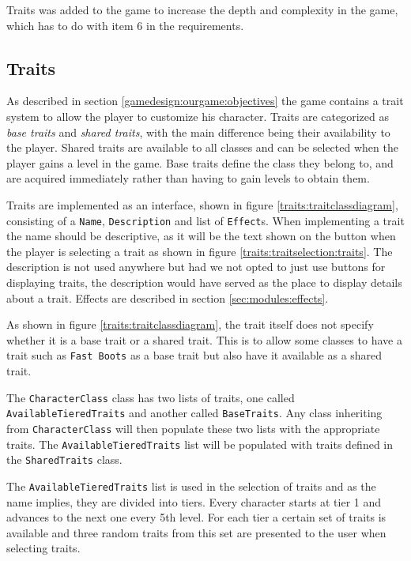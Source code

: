 Traits was added to the game to increase the depth and complexity in the game, which has to do with item 6 in the requirements.
\subsection{Traits}
\label{sec:modules:traits}
As described in section \ref{gamedesign:ourgame:objectives} the game contains a trait system to allow the player to customize his character.
Traits are categorized as \textit{base traits} and \textit{shared traits}, with the main difference being their availability to the player.
Shared traits are available to all classes and can be selected when the player gains a level in the game.
Base traits define the class they belong to, and are acquired immediately rather than having to gain levels to obtain them.

Traits are implemented as an interface, shown in figure \ref{traits:traitclassdiagram}, consisting of a \texttt{Name}, \texttt{Description} and list of \texttt{Effect}s.
When implementing a trait the name should be descriptive, as it will be the text shown on the button when the player is selecting a trait as shown in figure \ref{traits:traitselection:traits}. 
The description is not used anywhere but had we not opted to just use buttons for displaying traits, the description would have served as the place to display details about a trait.
Effects are described in section \ref{sec:modules:effects}.

As shown in figure \ref{traits:traitclassdiagram}, the trait itself does not specify whether it is a base trait or a shared trait.
This is to allow some classes to have a trait such as \texttt{Fast Boots} as a base trait but also have it available as a shared trait.

The \texttt{CharacterClass} class has two lists of traits, one called \texttt{AvailableTieredTraits} and another called \texttt{BaseTraits}.
Any class inheriting from \texttt{CharacterClass} will then populate these two lists with the appropriate traits.
The \texttt{AvailableTieredTraits} list will be populated with traits defined in the \texttt{SharedTraits} class.

The \texttt{AvailableTieredTraits} list is used in the selection of traits and as the name implies, they are divided into tiers.
Every character starts at tier 1 and advances to the next one every 5th level.
For each tier a certain set of traits is available and three random traits from this set are presented to the user when selecting traits.

